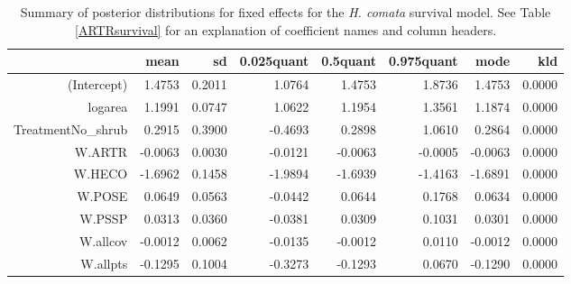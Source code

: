 \documentclass[11pt]{article}
\begin{document}
\begin{table}[ht]
\centering
\caption{Summary of posterior distributions for fixed effects for the \textit{H. comata} survival model. See Table \ref{ARTRsurvival} for an explanation of coefficient names
and column headers.} 
\label{HECOsurvival}
\begin{tabular}{rrrrrrrr}
  \hline
 & mean & sd & 0.025quant & 0.5quant & 0.975quant & mode & kld \\ 
  \hline
(Intercept) & 1.4753 & 0.2011 & 1.0764 & 1.4753 & 1.8736 & 1.4753 & 0.0000 \\ 
  logarea & 1.1991 & 0.0747 & 1.0622 & 1.1954 & 1.3561 & 1.1874 & 0.0000 \\ 
  TreatmentNo\_shrub & 0.2915 & 0.3900 & -0.4693 & 0.2898 & 1.0610 & 0.2864 & 0.0000 \\ 
  W.ARTR & -0.0063 & 0.0030 & -0.0121 & -0.0063 & -0.0005 & -0.0063 & 0.0000 \\ 
  W.HECO & -1.6962 & 0.1458 & -1.9894 & -1.6939 & -1.4163 & -1.6891 & 0.0000 \\ 
  W.POSE & 0.0649 & 0.0563 & -0.0442 & 0.0644 & 0.1768 & 0.0634 & 0.0000 \\ 
  W.PSSP & 0.0313 & 0.0360 & -0.0381 & 0.0309 & 0.1031 & 0.0301 & 0.0000 \\ 
  W.allcov & -0.0012 & 0.0062 & -0.0135 & -0.0012 & 0.0110 & -0.0012 & 0.0000 \\ 
  W.allpts & -0.1295 & 0.1004 & -0.3273 & -0.1293 & 0.0670 & -0.1290 & 0.0000 \\ 
   \hline
\end{tabular}
\end{table}
\end{document}
